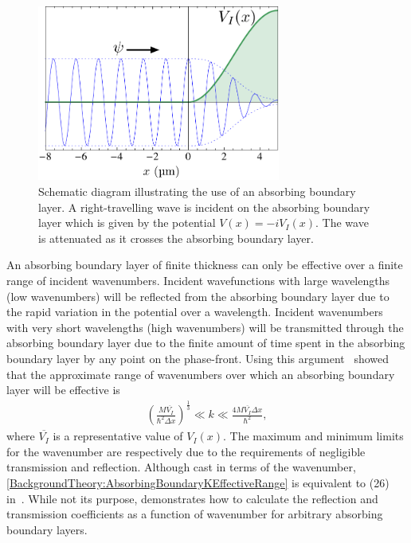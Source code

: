 \begin{figure}
    \centering
    \includegraphics[width=8cm]{AbsorbingBoundarySchematic}
    \caption{
        \label{BackgroundTheory:AbsorbingBoundarySchematic}
        Schematic diagram illustrating the use of an absorbing boundary layer. A right-travelling wave is incident on the absorbing boundary layer which is given by the potential $V(x) = -i V_I(x)$. The wave is attenuated as it crosses the absorbing boundary layer.
    }
\end{figure}

An absorbing boundary layer of finite thickness can only be effective over a finite range of incident wavenumbers. Incident wavefunctions with large wavelengths (low wavenumbers) will be reflected from the absorbing boundary layer due to the rapid variation in the potential over a wavelength. Incident wavenumbers with very short wavelengths (high wavenumbers) will be transmitted through the absorbing boundary layer due to the finite amount of time spent in the absorbing boundary layer by any point on the phase-front.  Using this argument~\citet{Neuhasuer:1989} showed that the approximate range of wavenumbers over which an absorbing boundary layer will be effective is
\begin{align}
    \label{BackgroundTheory:AbsorbingBoundaryKEffectiveRange}
    \left( \frac{M \overline{V_I}}{\hbar^2 \Delta x}\right)^{\frac{1}{3}} \ll k \ll \frac{4 M \overline{V_I} \Delta x}{\hbar^2},
\end{align}
where $\overline{V_I}$ is a representative value of $V_I(x)$. The maximum and minimum limits for the wavenumber are respectively due to the requirements of negligible transmission and reflection. Although cast in terms of the wavenumber, \eqref{BackgroundTheory:AbsorbingBoundaryKEffectiveRange} is equivalent to (26) in~\citep{Neuhasuer:1989}. While not its purpose,  demonstrates how to calculate the reflection and transmission coefficients as a function of wavenumber for arbitrary absorbing boundary layers.


